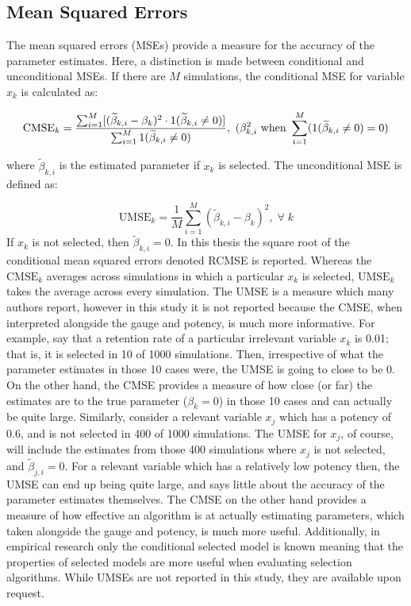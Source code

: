 \subsection{Mean Squared Errors}



The mean squared errors (MSEs) provide a measure for the accuracy of the parameter estimates. Here, a distinction is made between conditional and unconditional MSEs. If there are $M$ simulations, the conditional MSE for variable $x_{k}$ is calculated as:

$$ \textrm{CMSE}_{k} = \frac{\sum_{i=1}^{M}[(\widetilde\beta_{k,i} - \beta_{k})^{2} \cdot 1(\widetilde\beta_{k,i} \neq 0)]}{\sum_{i=1}^{M}1(\widetilde\beta_{k,i} \neq 0)},\-\-\-\-\ (\beta_{k,i}^{2} \textrm{ when  } \sum_{i=1}^{M}(1(\widetilde\beta_{k,i} \neq 0)=0)$$

where $\widetilde\beta_{k,i}$ is the estimated parameter if $x_{k}$ is selected. The unconditional MSE is defined as:

$$ \textrm{UMSE}_{k} = \frac{1}{M}\sum_{i=1}^{M}(\widetilde\beta_{k,i} - \beta_{k})^{2}, \; \forall \; k$$
If $x_{k}$ is not selected, then $\widetilde\beta_{k,i} = 0$. In this thesis the square root of the conditional mean squared errors denoted RCMSE is reported. Whereas the $\textrm{CMSE}_{k}$ averages across simulations in which a particular $x_{k}$ is selected, $\textrm{UMSE}_{k}$ takes the average across every simulation.  The UMSE is a measure which many authors report, however in this study it is not reported because the CMSE, when interpreted alongside the gauge and potency, is much more informative. For example, say that a retention rate of a particular irrelevant variable $x_{k}$ is 0.01; that is, it is selected in 10 of 1000 simulations. Then, irrespective of what the parameter estimates in those 10 cases were, the UMSE is going to close to be 0. On the other hand, the CMSE provides a measure of how close (or far) the estimates are to the true parameter ($\beta_{k} = 0$) in those 10 cases and can actually be quite large. Similarly, consider a relevant variable $x_{j}$ which has a potency of 0.6, and is not selected in 400 of 1000 simulations. The UMSE for $x_{j}$, of course, will include the estimates from those 400 simulations where $x_{j}$ is not selected, and $\widetilde\beta_{j,i}=0$. For a relevant variable which has a relatively low potency then, the UMSE can end up being quite large, and says little about the accuracy of the parameter estimates themselves. The CMSE on the other hand provides a measure of how effective an algorithm is at actually estimating parameters, which taken alongside the gauge and potency, is much more useful. Additionally, in empirical research only the conditional selected model is known meaning that the properties of selected models are more useful when evaluating selection algorithms. While UMSEs are not reported in this study, they are available upon request. 


